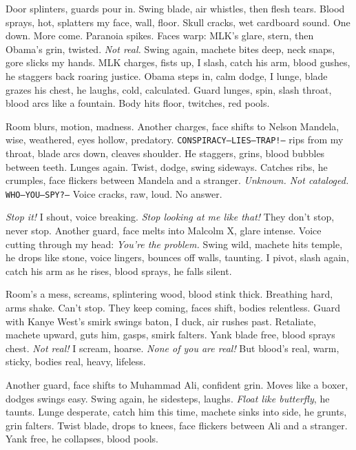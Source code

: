 \documentclass[12pt,oneside]{book}
\newcommand{\note}[1]{\texttt{#1}}
\begin{document}
Door splinters, guards pour in. Swing blade, air whistles, then flesh tears. Blood sprays, hot, splatters my face, wall, floor. Skull cracks, wet cardboard sound. One down. More come. Paranoia spikes. Faces warp: \textnormal{MLK}’s glare, stern, then \textnormal{Obama}’s grin, twisted. \textit{Not real.} Swing again, machete bites deep, neck snaps, gore slicks my hands. \textnormal{MLK} charges, fists up, I slash, catch his arm, blood gushes, he staggers back roaring justice. \textnormal{Obama} steps in, calm dodge, I lunge, blade grazes his chest, he laughs, cold, calculated. Guard lunges, spin, slash throat, blood arcs like a fountain. Body hits floor, twitches, red pools.

Room blurs, motion, madness. Another charges, face shifts to \textnormal{Nelson Mandela}, wise, weathered, eyes hollow, predatory. \note{CONSPIRACY—LIES—TRAP!—} rips from my throat, blade arcs down, cleaves shoulder. He staggers, grins, blood bubbles between teeth. Lunges again. Twist, dodge, swing sideways. Catches ribs, he crumples, face flickers between \textnormal{Mandela} and a stranger. \textit{Unknown. Not cataloged.} \note{WHO—YOU—SPY?—} Voice cracks, raw, loud. No answer.

\textit{Stop it!} I shout, voice breaking. \textit{Stop looking at me like that!} They don’t stop, never stop. Another guard, face melts into \textnormal{Malcolm X}, glare intense. Voice cutting through my head: \textit{You’re the problem.} Swing wild, machete hits temple, he drops like stone, voice lingers, bounces off walls, taunting. I pivot, slash again, catch his arm as he rises, blood sprays, he falls silent.

Room’s a mess, screams, splintering wood, blood stink thick. Breathing hard, arms shake. Can’t stop. They keep coming, faces shift, bodies relentless. Guard with \textnormal{Kanye West}’s smirk swings baton, I duck, air rushes past. Retaliate, machete upward, guts him, gasps, smirk falters. Yank blade free, blood sprays chest. \textit{Not real!} I scream, hoarse. \textit{None of you are real!} But blood’s real, warm, sticky, bodies real, heavy, lifeless.

Another guard, face shifts to \textnormal{Muhammad Ali}, confident grin. Moves like a boxer, dodges swings easy. Swing again, he sidesteps, laughs. \textit{Float like butterfly}, he taunts. Lunge desperate, catch him this time, machete sinks into side, he grunts, grin falters. Twist blade, drops to knees, face flickers between \textnormal{Ali} and a stranger. Yank free, he collapses, blood pools.
\end{document}
